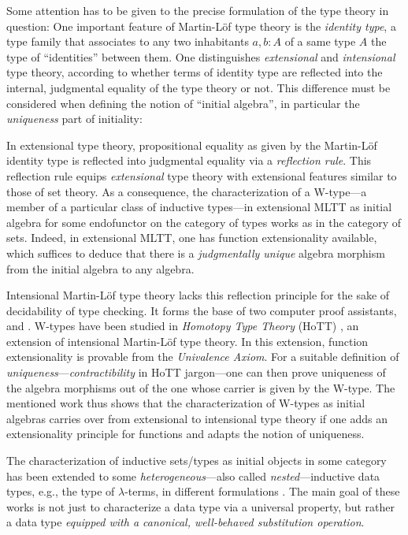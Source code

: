 \documentclass[envcountsame]{llncs}
\begin{document}
 Some attention has to be given to 
 the precise formulation of the type theory in question:
 One important feature of Martin-L\"of type theory is the \emph{identity type}, a type family that associates to any two 
 inhabitants $a,b : A$ of a same type $A$ the type of \enquote{identities} between them.
 One distinguishes \emph{extensional} and \emph{intensional} type theory, according to whether terms of identity type
 are reflected into the internal, judgmental equality of the type theory or not. This difference must be considered when defining the notion of
 \enquote{initial algebra}, in particular the \emph{uniqueness} part of initiality:
 
 In extensional type theory, propositional equality as given by the Martin-L\"of identity type \parencite{martin_lof} is reflected 
 into judgmental equality via a \emph{reflection rule}.
 This reflection rule equips \emph{extensional} type theory with extensional features similar to those of set theory.
 As a consequence, the characterization of a \textsf{W}-type---a member of a particular class of inductive types---in extensional MLTT as initial algebra for some endofunctor on the 
 category of types \parencite{DBLP:journals/tcs/Dybjer97} works as in the category of sets.
 Indeed, in extensional MLTT, one has function extensionality available, which suffices to 
 deduce that there is a \emph{judgmentally unique} algebra morphism from the initial algebra to any algebra.


 Intensional Martin-L\"of type theory \parencite{martin_lof} lacks this reflection principle for the sake of decidability of type checking. 
 It forms the base of two computer proof assistants, \coq and \agda.
 \textsf{W}-types have been studied \parencite{DBLP:conf/lics/AwodeyGS12} in \emph{Homotopy Type Theory} (HoTT) \parencite{hottbook}, an extension of intensional Martin-L\"of type theory. 
 In this extension, function extensionality is provable from the \emph{Univalence Axiom}. 
 For a suitable definition of \emph{uniqueness}---\emph{contractibility} in HoTT jargon---one can then prove uniqueness of the
 algebra morphisms out of the one whose carrier is given by the \textsf{W}-type.
 The mentioned work \parencite{DBLP:conf/lics/AwodeyGS12} thus shows that the characterization of \textsf{W}-types as initial algebras carries over 
 from extensional to intensional type theory if one adds an extensionality principle for functions and adapts the notion of uniqueness.
 
 
 The characterization of inductive sets/types as initial objects in some category
 has been extended to some \emph{heterogeneous}---also called \emph{nested}---inductive data types, e.g., the type of $\lambda$-terms,
 in different formulations \parencite{fpt, DBLP:journals/iandc/HirschowitzM10}.
 The main goal of these works is not just to characterize a data type via a universal property, but rather a data type
 \emph{equipped with a canonical, well-behaved substitution operation}.
 
\end{document}
